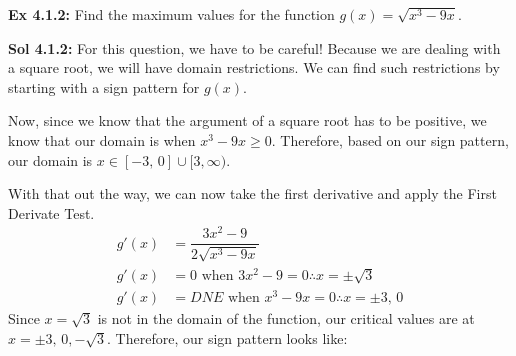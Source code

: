 \begin{tcolorbox}[example]
    \textbf{Ex 4.1.2: } Find the maximum values for the function $g(x) = \sqrt{x^3 - 9x}$.
\end{tcolorbox}
\begin{tcolorbox}[solution]
    \textbf{Sol 4.1.2: } For this question, we have to be careful! Because we are dealing with a square root, we will have domain restrictions. We can find such restrictions by starting with a sign pattern for $g(x)$. \\
    \begin{center}
    \end{center}
    Now, since we know that the argument of a square root has to be positive, we know that our domain is when $x^3 - 9x \geq 0$. Therefore, based on our sign pattern, our domain is $x \in [-3, \, 0] \cup [3, \infty)$. \par
    \vspace{11pt}
    With that out the way, we can now take the first derivative and apply the First Derivate Test. \begin{align*}
        g'(x) &= \dfrac{3x^2 - 9}{2\sqrt{x^3 - 9x}} \\[11pt]
        g'(x) &= 0 \text{ when } 3x^2 - 9 = 0 \therefore x = \pm \sqrt{3} \\[11pt]
        g'(x) &= DNE \text{ when } x^3 - 9x = 0 \therefore x = \pm 3, \, 0
    \end{align*}
    Since $x = \sqrt{3}$ is not in the domain of the function, our critical values are at $x = \pm 3, \, 0, -\sqrt{3}$. Therefore, our sign pattern looks like: \\
    \begin{center}
\end{center}
\end{tcolorbox}
